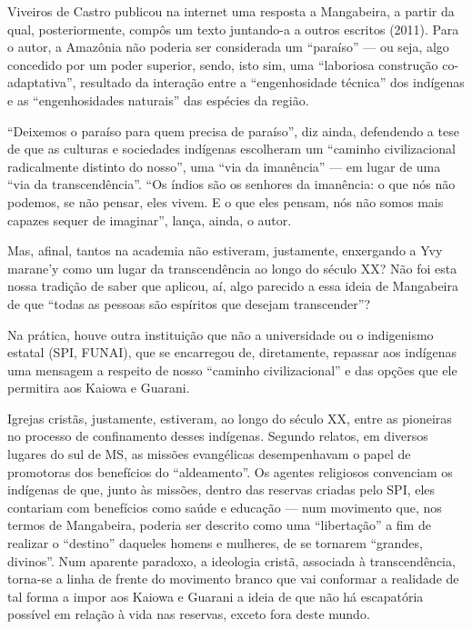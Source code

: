 Viveiros de Castro publicou na internet uma resposta a Mangabeira, a
partir da qual, posteriormente, compôs um texto juntando-a a outros
escritos (2011). Para o autor, a Amazônia não poderia ser considerada
um ``paraíso'' — ou seja, algo concedido por um poder superior, sendo,
isto sim, uma ``laboriosa construção co-adaptativa'', resultado da
interação entre a ``engenhosidade técnica'' dos indígenas e as
``engenhosidades naturais''  das espécies da região. 

``Deixemos o paraíso para quem precisa de paraíso'', diz ainda, defendendo
a tese de que as culturas e sociedades indígenas escolheram um ``caminho
civilizacional radicalmente distinto do nosso'', uma ``via da imanência''
— em lugar de uma ``via da transcendência''. ``Os índios são os senhores
da imanência: o que nós não podemos, se não pensar, eles vivem. E o que
eles pensam, nós não somos mais capazes sequer de imaginar'', lança,
ainda, o autor.

Mas, afinal, tantos na academia não estiveram, justamente, enxergando a
Yvy marane’y como um lugar da transcendência ao longo do século XX? Não
foi esta nossa tradição de saber que aplicou, aí, algo parecido a essa
ideia de Mangabeira de que ``todas as pessoas são espíritos que desejam
transcender''?

Na prática, houve outra instituição que não a universidade ou o
indigenismo estatal (SPI, FUNAI), que se encarregou de, diretamente,
repassar aos indígenas uma mensagem a respeito de nosso ``caminho
civilizacional'' e das opções que ele permitira aos Kaiowa e Guarani. 

Igrejas cristãs, justamente, estiveram, ao longo do século XX, entre as
pioneiras no processo de confinamento desses indígenas. Segundo
relatos, em diversos lugares do sul de MS, as missões evangélicas
desempenhavam o papel de promotoras dos benefícios do ``aldeamento''. Os
agentes religiosos convenciam os indígenas de que, junto às missões,
dentro das reservas criadas pelo SPI, eles contariam com benefícios
como saúde e educação — num movimento que, nos termos de Mangabeira,
poderia ser descrito como uma ``libertação'' a fim de realizar o
``destino'' daqueles homens e mulheres, de se tornarem ``grandes,
divinos''. Num aparente paradoxo, a ideologia cristã, associada à
transcendência, torna-se a linha de frente do movimento branco que vai
conformar a realidade de tal forma a impor aos Kaiowa e Guarani a ideia
de que não há escapatória possível em relação à vida nas reservas,
exceto fora deste mundo. 

